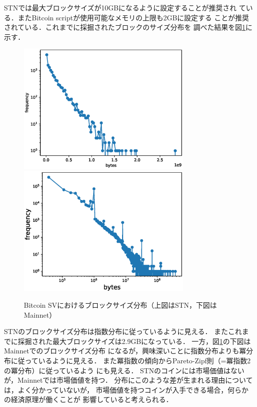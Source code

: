 \documentclass[graybox]{svmult}
\begin{document}
STNでは最大ブロックサイズが10GBになるように設定することが推奨され
ている．またBitcoin scriptが使用可能なメモリの上限も2GBに設定する
ことが推奨されている．これまでに採掘されたブロックのサイズ分布を
調べた結果を図\ref{fig:block_size}に示す．
%
\begin{figure}[t]
  \vspace{-45mm}
  \begin{center}
    \includegraphics[width=85mm]{bsv_stn-block_bytes-semilogy2.eps}
    \includegraphics[width=85mm]{bsv_mainnet-block_bytes-loglog.eps}
  \end{center}
  \vspace{45mm}
  \caption{Bitcoin SVにおけるブロックサイズ分布（上図はSTN，下図はMainnet）}
  \label{fig:block_size}
\end{figure}
%
STNのブロックサイズ分布は指数分布に従っているように見える．
またこれまでに採掘された最大ブロックサイズは2.9GBになっている．
一方，図\ref{fig:block_size}の下図はMainnetでのブロックサイズ分布
になるが，興味深いことに指数分布よりも冪分布に従っているように見える．
また冪指数の傾向からPareto-Zipf則（=冪指数2の冪分布）に従っているよう
にも見える．
STNのコインには市場価値はないが，Mainnetでは市場価値を持つ．
分布にこのような差が生まれる理由については，よく分かっていないが，
市場価値を持つコインが入手できる場合，何らかの経済原理が働くことが
影響していると考えられる．
\end{document}
